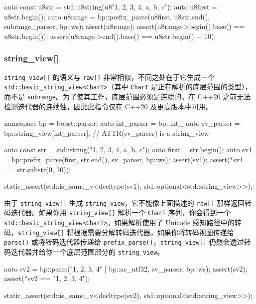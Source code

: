 \begin{code}
auto const u8str = std::u8string(u8"1, 2, 3, 4, a, b, c");
auto u8first = u8str.begin();
auto u8range = bp::prefix_parse(u8first, u8str.end(), subrange_parser, bp::ws);
assert(u8range);
assert(u8range->begin().base() == u8str.begin());
assert(u8range->end().base() == u8str.begin() + 10);
\end{code}

\subsubsection{string\_view{[}{]}}

\texttt{string\_view{[}{]}} 的语义与 \texttt{raw{[}{]}} 非常相似，不同之处在于它生成一个 \texttt{std::basic\_string\_view<CharT>}（其中 \texttt{CharT} 是正在解析的底层范围的类型），而不是 \texttt{subrange}。为了使其工作，底层范围必须是连续的。在 C++20 之前无法检测迭代器的连续性，因此此指令仅在 C++20 及更高版本中可用。

\begin{code}
namespace bp = boost::parser;
auto int_parser = bp::int_ %
auto sv_parser = bp::string_view[int_parser];  // ATTR(sv_parser) is a string_view

auto const str = std::string("1, 2, 3, 4, a, b, c");
auto first = str.begin();
auto sv1 = bp::prefix_parse(first, str.end(), sv_parser, bp::ws);
assert(sv1);
assert(*sv1 == str.substr(0, 10));

static_assert(std::is_same_v<decltype(sv1), std::optional<std::string_view>>);
\end{code}

由于 \texttt{string\_view{[}{]}} 生成 \texttt{string\_view}，它不能像上面描述的 \texttt{raw{[}{]}} 那样返回转码迭代器。如果你用 \texttt{string\_view{[}{]}} 解析一个 \texttt{CharT} 序列，你会得到一个 \texttt{std::basic\_string\_view<CharT>}。如果解析使用了 Unicode 感知路径中的转码，\texttt{string\_view{[}{]}} 将根据需要分解转码迭代器。如果你将转码视图传递给 \texttt{parse()} 或将转码迭代器传递给 \texttt{prefix\_parse()}，\texttt{string\_view{[}{]}} 仍然会透过转码迭代器并给你一个底层范围部分的 \texttt{string\_view}。

\begin{code}
auto sv2 = bp::parse("1, 2, 3, 4" | bp::as_utf32, sv_parser, bp::ws);
assert(sv2);
assert(*sv2 == "1, 2, 3, 4");

static_assert(std::is_same_v<decltype(sv2), std::optional<std::string_view>>);
\end{code}

